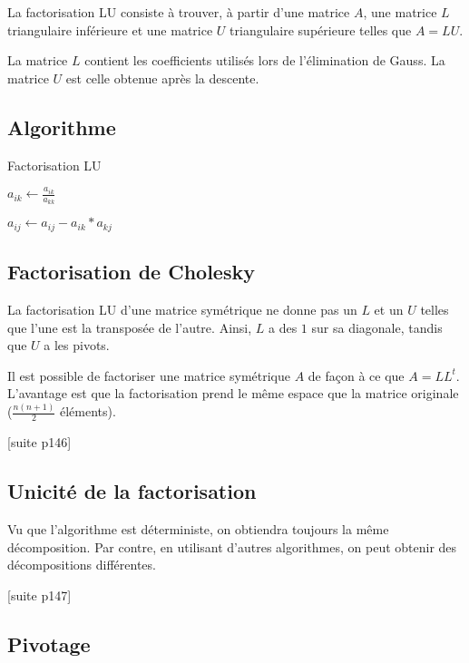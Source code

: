 La factorisation LU consiste à trouver, à partir d'une matrice $A$, une matrice $L$ triangulaire inférieure et une matrice $U$ triangulaire supérieure telles que $A = LU$.

La matrice $L$ contient les coefficients utilisés lors de l'élimination de Gauss. La matrice $U$ est celle obtenue après la descente.


	\subsection{Algorithme}
	
\begin{algorithm}
\caption{Factorisation LU}
\begin{algorithmic}
		\STATE $a_{ik} \leftarrow \frac{a_{i k}}{a_{kk}}$ 
		
			\STATE $a_{ij} \leftarrow a_{ij} - a_{i k} * a_{k j}$
		\ENDFOR
	\ENDFOR
\ENDFOR
\end{algorithmic}
\end{algorithm}
	
	\subsection{Factorisation de Cholesky}

	La factorisation LU d'une matrice symétrique ne donne pas un $L$ et un $U$ telles que l'une est la transposée de l'autre. Ainsi, $L$ a des $1$ sur sa diagonale, tandis que $U$ a les pivots.
	
	Il est possible de factoriser une matrice symétrique $A$ de façon à ce que $A = L L^t$. L'avantage est que la factorisation prend le même espace que la matrice originale ($\frac{n (n + 1)}{2}$ éléments).
	
	[suite p146]
	
	\subsection{Unicité de la factorisation}
	
	Vu que l'algorithme est déterministe, on obtiendra toujours la même décomposition. Par contre, en utilisant d'autres algorithmes, on peut obtenir des décompositions différentes.
	
	[suite p147]
	
	\subsection{Pivotage}
	
